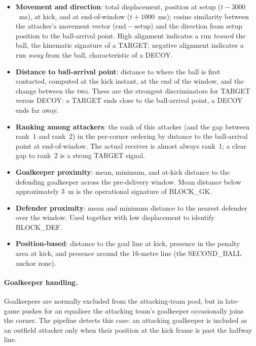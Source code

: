 \begin{itemize}
  \item \textbf{Movement and direction}: total displacement, position at
        setup ($t-3000$~ms), at kick, and at end-of-window ($t+1000$~ms);
        cosine similarity between the attacker's movement vector
        ($\mathrm{end} - \mathrm{setup}$) and the direction from setup
        position to the ball-arrival point. High alignment indicates a run
        \emph{toward} the ball, the kinematic signature of a TARGET; negative
        alignment indicates a run \emph{away} from the ball, characteristic
        of a DECOY.
  \item \textbf{Distance to ball-arrival point}: distance to where the ball
        is first contacted, computed at the kick instant, at the end of the
        window, and the change between the two. These are the strongest
        discriminators for TARGET versus DECOY: a TARGET ends close to the
        ball-arrival point, a DECOY ends far away.
  \item \textbf{Ranking among attackers}: the rank of this attacker (and the
        gap between rank~1 and rank~2) in the per-corner ordering by distance
        to the ball-arrival point at end-of-window. The actual receiver is
        almost always rank~1; a clear gap to rank~2 is a strong TARGET signal.
  \item \textbf{Goalkeeper proximity}: mean, minimum, and at-kick distance to
        the defending goalkeeper across the pre-delivery window. Mean
        distance below approximately 3~m is the operational signature of
        BLOCK\_GK.
  \item \textbf{Defender proximity}: mean and minimum distance to the
        nearest defender over the window. Used together with low displacement
        to identify BLOCK\_DEF.
  \item \textbf{Position-based}: distance to the goal line at kick, presence
        in the penalty area at kick, and presence around the 16-metre line
        (the SECOND\_BALL anchor zone).
\end{itemize}

\paragraph{Goalkeeper handling.}
Goalkeepers are normally excluded from the attacking-team pool, but in
late-game pushes for an equaliser the attacking team's goalkeeper occasionally
joins the corner. The pipeline detects this case: an attacking goalkeeper is
included as an outfield attacker only when their position at the kick frame
is past the halfway line.

